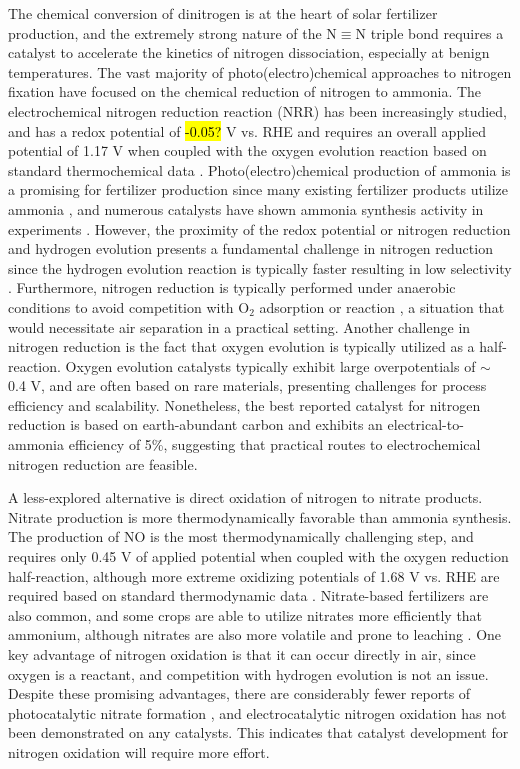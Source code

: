 The chemical conversion of dinitrogen is at the heart of solar fertilizer production, and the extremely strong nature of the N$\equiv$N triple bond requires a catalyst to accelerate the kinetics of nitrogen dissociation, especially at benign temperatures. The vast majority of photo(electro)chemical approaches to nitrogen fixation have focused on the chemical reduction of nitrogen to ammonia. The electrochemical nitrogen reduction reaction (NRR) has been increasingly studied, and has a redox potential of \hl{-0.05?} V vs. RHE and requires an overall applied potential of 1.17 V when coupled with the oxygen evolution reaction based on standard thermochemical data \cite{Medford_2017}. Photo(electro)chemical production of ammonia is a promising for fertilizer production since many existing fertilizer products utilize ammonia \needcite, and numerous catalysts have shown ammonia synthesis activity in experiments \needcite. However, the proximity of the redox potential or nitrogen reduction and hydrogen evolution presents a fundamental challenge in nitrogen reduction since the hydrogen evolution reaction is typically faster resulting in low selectivity \cite{Skulason_2012,Singh_2017}. Furthermore, nitrogen reduction is typically performed under anaerobic conditions to avoid competition with O$_2$ adsorption or reaction \needcite, a situation that would necessitate air separation in a practical setting. Another challenge in nitrogen reduction is the fact that oxygen evolution is typically utilized as a half-reaction. Oxygen evolution catalysts typically exhibit large overpotentials of $\sim$ 0.4 V, and are often based on rare materials, presenting challenges for process efficiency and scalability. Nonetheless, the best reported catalyst for nitrogen reduction is based on earth-abundant carbon and exhibits an electrical-to-ammonia efficiency of 5\%, suggesting that practical routes to electrochemical nitrogen reduction are feasible.

A less-explored alternative is direct oxidation of nitrogen to nitrate products. Nitrate production is more thermodynamically favorable than ammonia synthesis. The production of NO is the most thermodynamically challenging step, and requires only 0.45 V of applied potential when coupled with the oxygen reduction half-reaction, although more extreme oxidizing potentials of 1.68 V vs. RHE are required based on standard thermodynamic data \cite{Chen_2018,Medford_2017, Comer_2018}. Nitrate-based fertilizers are also common, and some crops are able to utilize nitrates more efficiently that ammonium, although nitrates are also more volatile and prone to leaching \needcite. One key advantage of nitrogen oxidation is that it can occur directly in air, since oxygen is a reactant, and competition with hydrogen evolution is not an issue. Despite these promising advantages, there are considerably fewer reports of photocatalytic nitrate formation \needcite, and electrocatalytic nitrogen oxidation has not been demonstrated on any catalysts. This indicates that catalyst development for nitrogen oxidation will require more effort. 

